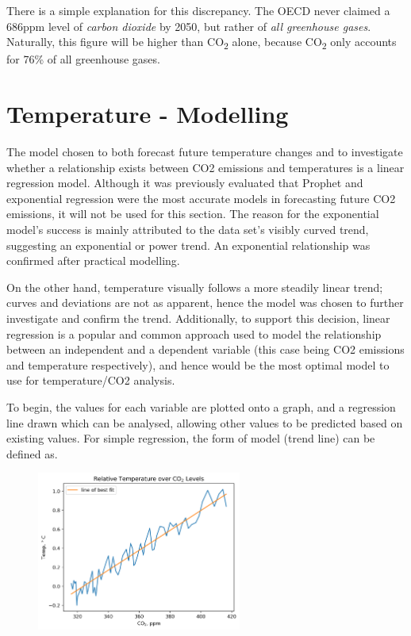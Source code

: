 \documentclass[12pt]{mcmthesis}
\begin{document}
    There is a simple explanation for this discrepancy. The OECD never claimed a 686ppm level of \textit{carbon dioxide} by 2050, but rather of \textit{all greenhouse gases}. Naturally, this figure will be higher than CO\textsubscript{2} alone, because CO\textsubscript{2} only accounts for 76\% of all greenhouse gases.


    \section{Temperature - Modelling}

    The model chosen to both forecast future temperature changes and to investigate whether a relationship exists between CO2 emissions and temperatures is a linear regression model. Although it was previously evaluated that Prophet and exponential regression were the most accurate models in forecasting future CO2 emissions, it will not be used for this section. The reason for the exponential model’s success is mainly attributed to the data set’s visibly curved trend, suggesting an exponential or power trend. An exponential relationship was confirmed after practical modelling.

    On the other hand, temperature visually follows a more steadily linear trend; curves and deviations are not as apparent, hence the model was chosen to further investigate and confirm the trend. Additionally, to support this decision, linear regression is a popular and common approach used to model the relationship between an independent and a dependent variable (this case being CO2 emissions and temperature respectively), and hence would be the most optimal model to use for temperature/CO2 analysis.

    To begin, the values for each variable are plotted onto a graph, and a regression line drawn which can be analysed, allowing other values to be predicted based on existing values. For simple regression, the form of model (trend line) can be defined as.

    \begin{figure}
        \centering
        \includegraphics[width=0.6\textwidth]{ct2}
        \label{fig:ct}
    \end{figure}
\end{document}
